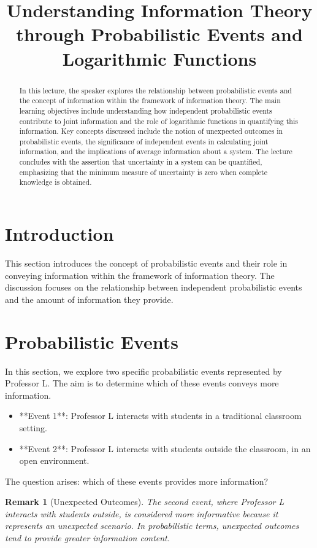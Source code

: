 \documentclass[12pt,a4paper]{article}
\title{Understanding Information Theory through Probabilistic Events and Logarithmic Functions}
\newtheorem{remark}{Remark}[section]
\begin{document}
\maketitle
\begin{abstract}
In this lecture, the speaker explores the relationship between probabilistic events and the concept of information within the framework of information theory. The main learning objectives include understanding how independent probabilistic events contribute to joint information and the role of logarithmic functions in quantifying this information. Key concepts discussed include the notion of unexpected outcomes in probabilistic events, the significance of independent events in calculating joint information, and the implications of average information about a system. The lecture concludes with the assertion that uncertainty in a system can be quantified, emphasizing that the minimum measure of uncertainty is zero when complete knowledge is obtained.
\end{abstract}

\section{Introduction}
This section introduces the concept of probabilistic events and their role in conveying information within the framework of information theory. The discussion focuses on the relationship between independent probabilistic events and the amount of information they provide.

\section{Probabilistic Events}
In this section, we explore two specific probabilistic events represented by Professor L. The aim is to determine which of these events conveys more information.

\begin{itemize}
    \item **Event 1**: Professor L interacts with students in a traditional classroom setting.
    \item **Event 2**: Professor L interacts with students outside the classroom, in an open environment.
\end{itemize}

The question arises: which of these events provides more information? 

\begin{remark}[Unexpected Outcomes]
The second event, where Professor L interacts with students outside, is considered more informative because it represents an unexpected scenario. In probabilistic terms, unexpected outcomes tend to provide greater information content.
\end{remark}
\end{document}
